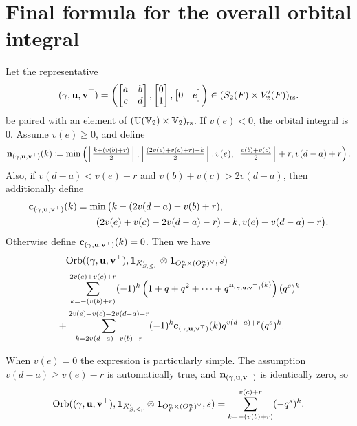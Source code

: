 \section{Final formula for the overall orbital integral}
\begin{theorem}
  \label{thm:semi_lie_formula}
  Let the representative
  \[
    {(\gamma, \mathbf u, \mathbf v^\top)} = \left( \begin{bmatrix} a & b \\ c & d \end{bmatrix},
      \begin{bmatrix} 0 \\ 1 \end{bmatrix},
      \begin{bmatrix} 0 & e \end{bmatrix} \right)
    \in (S_2(F) \times V_2'(F))_{\mathrm{rs}}.
  \]
  be paired with an element of $(\operatorname{U}(\mathbb V_2) \times \mathbb V_2)_{\mathrm{rs}}$.
  If $v(e) < 0$, the orbital integral is $0$.
  Assume $v(e) \ge 0$, and define
  \[ \mathbf n_{(\gamma, \mathbf u, \mathbf v^\top)}(k) \coloneqq \min\left( \left\lfloor \tfrac{k + (v(b)+r)}{2} \right\rfloor,
      \left\lfloor \tfrac{(2v(e)+v(c)+r)-k}{2} \right\rfloor,
      v(e), \left\lfloor \tfrac{v(b)+v(c)}{2} \right\rfloor + r,
      v(d-a) + r \right). \]
  Also, if $v(d-a) < v(e) - r$ and $v(b) + v(c) > 2v(d-a)$, then additionally define
  \begin{align*}
    \mathbf c_{(\gamma, \mathbf u, \mathbf v^\top)}(k) &= \min\big( k - (2v(d-a)-v(b)+r), \\
      &\qquad (2v(e)+v(c)-2v(d-a)-r)-k, v(e)-v(d-a)-r \big).
  \end{align*}
  Otherwise define $\mathbf c_{(\gamma, \mathbf u, \mathbf v^\top)}(k) = 0$.
  Then we have
  \begin{align*}
    &\phantom= \Orb(\guv, \mathbf{1}_{K'_{S, \le r}} \otimes \oneV, s) \\
    &= \sum_{k = -(v(b)+r)}^{2v(e)+v(c)+r} (-1)^k
    \left( 1 + q + q^2 + \dots + q^{\nn_\guv(k)} \right) (q^s)^k \\
    &+ \sum_{k = 2v(d-a)-v(b)+r}^{2v(e)+v(c)-2v(d-a)-r} (-1)^k \cc_\guv(k) q^{v(d-a) + r} (q^s)^k.
  \end{align*}
\end{theorem}
\begin{example}
  When $v(e) = 0$ the expression is particularly simple.
  The assumption $v(d-a) \ge v(e)-r$ is automatically true, and
  $\mathbf n_{{(\gamma, \mathbf u, \mathbf v^\top)}}$ is identically zero, so
  \[ \operatorname{Orb}({(\gamma, \mathbf u, \mathbf v^\top)}, \mathbf{1}_{K'_{S, \le r}} \otimes \mathbf{1}_{O_F^n \times (O_F^n)^\vee}, s)
    = \sum_{k=-(v(b)+r)}^{v(c)+r} (-q^s)^k. \]
\end{example}

